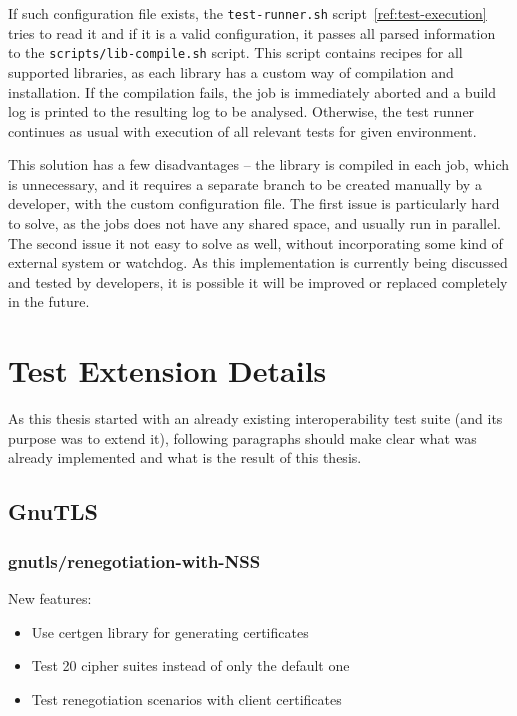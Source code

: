     If such configuration file exists, the \texttt{test-runner.sh}
    script~\ref{ref:test-execution} tries to read it and if it is a valid
    configuration, it passes all parsed information to the \texttt{scripts/lib-compile.sh}
    script. This script contains recipes for all supported libraries, as
    each library has a custom way of compilation and installation.
    If the compilation fails, the job is immediately aborted and a build log
    is printed to the resulting log to be analysed. Otherwise, the test runner continues
    as usual with execution of all relevant tests for given environment.

    This solution has a few disadvantages -- the library is compiled in each
    job, which is unnecessary, and it requires a separate branch to be created
    manually by a developer, with the custom configuration file. The first
    issue is particularly hard to solve, as the jobs does not have any shared
    space, and usually run in parallel. The second issue it not easy to solve as well,
    without incorporating some kind of external system or watchdog. As this
    implementation is currently being discussed and tested by developers, it is possible
    it will be improved or replaced completely in the future.

\section{Test Extension Details} \label{ref:test-extension-details}
    As this thesis started with an already existing interoperability
    test suite (and its purpose was
    to extend it), following paragraphs should make clear what was already
    implemented and what is the result of this thesis.

\subsection{GnuTLS}
\subsubsection{gnutls/renegotiation-with-NSS}
    New features:
    \begin{itemize}
        \item Use certgen library for generating certificates
        \item Test 20 cipher suites instead of only the default one
        \item Test renegotiation scenarios with client certificates
    \end{itemize}

